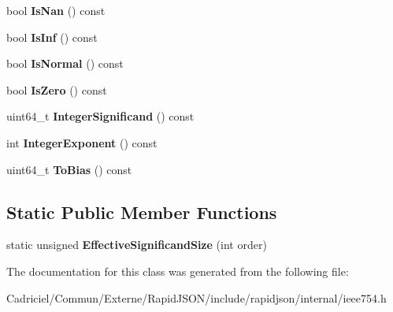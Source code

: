 \begin{DoxyCompactItemize}
\item 
bool {\bfseries Is\+Nan} () const \hypertarget{classinternal_1_1_double_a5c1ad93b8c866afdd5c2b412ef7bea98}{}\label{classinternal_1_1_double_a5c1ad93b8c866afdd5c2b412ef7bea98}

\item 
bool {\bfseries Is\+Inf} () const \hypertarget{classinternal_1_1_double_a2efab47ffbfa75e0fca1129263b86545}{}\label{classinternal_1_1_double_a2efab47ffbfa75e0fca1129263b86545}

\item 
bool {\bfseries Is\+Normal} () const \hypertarget{classinternal_1_1_double_ac34b7871eeb80d2b6bac48f144c97b51}{}\label{classinternal_1_1_double_ac34b7871eeb80d2b6bac48f144c97b51}

\item 
bool {\bfseries Is\+Zero} () const \hypertarget{classinternal_1_1_double_a6eb58f2690af582efeb9b76ef35c4c60}{}\label{classinternal_1_1_double_a6eb58f2690af582efeb9b76ef35c4c60}

\item 
uint64\+\_\+t {\bfseries Integer\+Significand} () const \hypertarget{classinternal_1_1_double_a96c5e0f06551e83565b5097950d30e32}{}\label{classinternal_1_1_double_a96c5e0f06551e83565b5097950d30e32}

\item 
int {\bfseries Integer\+Exponent} () const \hypertarget{classinternal_1_1_double_a8e16ee31d521fb56f0b98be427a9d47e}{}\label{classinternal_1_1_double_a8e16ee31d521fb56f0b98be427a9d47e}

\item 
uint64\+\_\+t {\bfseries To\+Bias} () const \hypertarget{classinternal_1_1_double_af8b543dc813f761d274824f7cef00a43}{}\label{classinternal_1_1_double_af8b543dc813f761d274824f7cef00a43}

\end{DoxyCompactItemize}
\subsection*{Static Public Member Functions}
\begin{DoxyCompactItemize}
\item 
static unsigned {\bfseries Effective\+Significand\+Size} (int order)\hypertarget{classinternal_1_1_double_a980c26d006068b23406805e9b0e02588}{}\label{classinternal_1_1_double_a980c26d006068b23406805e9b0e02588}

\end{DoxyCompactItemize}


The documentation for this class was generated from the following file\+:\begin{DoxyCompactItemize}
\item 
Cadriciel/\+Commun/\+Externe/\+Rapid\+J\+S\+O\+N/include/rapidjson/internal/ieee754.\+h\end{DoxyCompactItemize}
